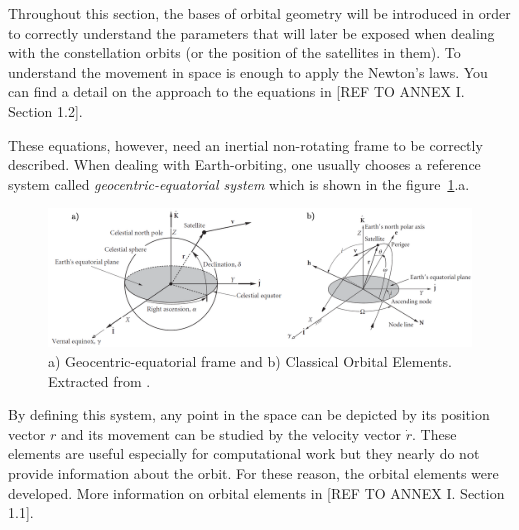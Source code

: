 Throughout this section, the bases of orbital geometry will be introduced in order to correctly understand the parameters that will later be exposed when dealing with the constellation orbits (or the position of the satellites in them). To understand the movement in space is enough to apply the Newton's laws. You can find a detail on the approach to the equations in [{REF TO ANNEX I. Section 1.2}].

These equations, however, need an inertial non-rotating frame to be correctly described. When dealing with Earth-orbiting, one usually chooses a reference system called \textit{geocentric-equatorial system} which is shown in the figure~\ref{fig:eqframe}.a. 

\begin{figure}[H]
\centering
\includegraphics[scale=.28]{./Geometry/fig-Ch1-Geometry/COE&eqframe.png}
\caption{a) Geocentric-equatorial frame and b) Classical Orbital Elements. Extracted from \cite{Howard}.}
\label{fig:eqframe}
\end{figure}

By defining this system, any point in the space can be depicted by its position vector $r$ and its movement can be studied by the velocity vector $\dot{r}$. These elements are useful especially for computational work but they nearly do not provide information about the orbit. For these reason, the orbital elements were developed. More information on orbital elements in [{REF TO ANNEX I. Section 1.1}].


